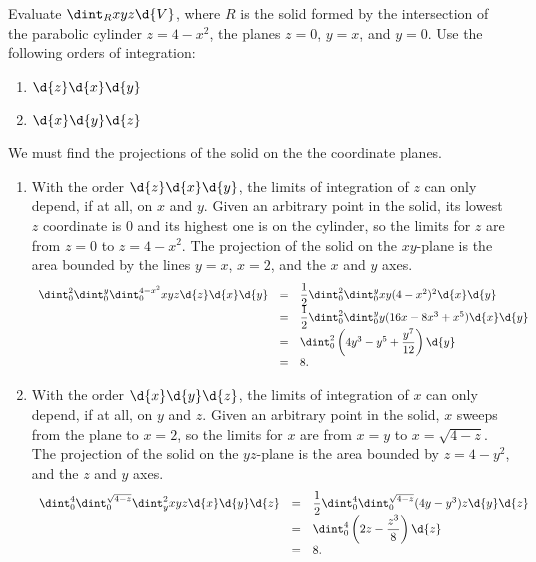 \begin{exa}
Evaluate $\dint _R xyz \d{V}$, where $R$ is the solid formed by the
intersection of the parabolic cylinder $z=4-x^2$, the planes $z=0$,
$y=x$, and $y=0$. Use the following orders of integration:
\begin{enumerate}
\item $\d{z}\d{x}\d{y}$
\item $\d{x}\d{y}\d{z}$
\end{enumerate}
\end{exa}
\begin{solu}
We must find the projections of the solid on the the coordinate
planes.
\begin{enumerate}
\item With the order $\d{z}\d{x}\d{y}$, the limits of integration of $z$ can 
only depend, if at all, on $x$ and $y$.
Given an arbitrary point in the solid,  its lowest $z$ coordinate is
$0$ and its highest one is on the cylinder, so the limits for $z$
are from $z=0$ to $z=4-x^2$. The projection of the solid on the
$xy$-plane is the area bounded by the lines $y=x$, $x=2$, and the
$x$ and $y$ axes.
$$\begin{array}{lll}\dint _0 ^2\dint _0 ^y\dint _0 ^{4-x^2}   xyz 
\d{z}\d{x}\d{y} &
= &  \dfrac{1}{2}\dint _0 ^2 \dint _0 ^y  xy(4-x^2)^2 \d{x}\d{y}\\
&
= &  \dfrac{1}{2}\dint _0 ^2 \dint _0 ^y  y(16x-8x^3+x^5) \d{x}\d{y}\\
&
= &  \dint _0 ^2 \left(4y^3-y^5+\dfrac{y^7}{12}\right)\d{y}\\
& = & 8.
\end{array}$$
\item With the order $\d{x}\d{y}\d{z}$, the limits of integration of $x$ can 
only depend, if at all, on $y$ and $z$.
Given an arbitrary point in the solid,   $x$ sweeps from the plane
to $x=2$, so the limits for $x$ are from $x=y$ to $x=\sqrt{4-z}$.
The projection of the solid on the $yz$-plane is the area bounded by
$z=4-y^2$, and the  $z$ and $y$ axes.
$$\begin{array}{lll}\dint _0 ^4\dint _0 ^{\sqrt{4-z}}\dint _y ^2   xyz 
\d{x}\d{y}\d{z} &
= &  \dfrac{1}{2}\dint _0 ^4 \dint _0 ^{\sqrt{4-z}}  (4y-y^3)z \d{y}\d{z}\\
&
= &  \dint _0 ^4 \left(2z-\dfrac{z^3}{8}\right)  \d{z}\\
& = & 8.
\end{array}$$
\end{enumerate}
\end{solu}

